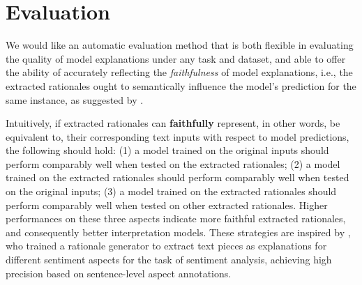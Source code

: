\documentclass[11pt,a4paper]{article}
\begin{document}
\section{Evaluation}
\label{sec:evaluation}
\begin{comment}
Though  substantial efforts have been invested to neural model interpretations, 
there has not been a generally accepted 
framework for evaluating different  interpretation models. 
One direct way for evaluation is to ask humans to annotate rationales within the input text, and compare  rationales extracted by interpretation models with human annotations, as in \newcite{deyoung-etal-2020-eraser}. 
The biggest issue with this methodology is that in many NLP tasks (e.g., fine-grained sentiment analysis), the difference between different labels is subtle (e.g.,  positive label v.s. very positive label or negative v.s. very negative label). It is thus hard for humans to annotate rationales that are both {\bf sufficient} and {\bf comprehensive}. 
Therefore, tasks in \newcite{deyoung-etal-2020-eraser}  are mostly limited to relatively easy NLP tasks, e.g., binary sentiment classification where 
for most data point, 
identifying constituent sentiment keywords suffices for predictions. 
\end{comment}
We would like an automatic evaluation method that is both flexible in evaluating the quality of model explanations under any task and dataset, and able to offer the ability of accurately reflecting the {\it faithfulness} of model explanations, i.e., the extracted rationales ought to semantically influence the model's prediction for the same instance,  as suggested by \citet{deyoung-etal-2020-eraser}.

Intuitively,  if  extracted rationales can {\bf faithfully} represent, in other words, be equivalent to, 
 their corresponding text inputs with respect to model predictions, the following should hold: 
(1)  a model trained on the original inputs 
   should perform comparably well when tested on the extracted rationales; 
   (2)  a model trained on the extracted rationales should  perform comparably well when tested on the original inputs;
   (3) a model trained on the  extracted rationales should  perform comparably well when tested on other extracted rationales.  
Higher performances on these three aspects indicate more faithful extracted rationales, and consequently better interpretation models. 
These strategies are inspired by , who trained a rationale generator to extract text pieces as explanations for different sentiment aspects for the task of sentiment analysis, achieving high precision based on  sentence-level aspect annotations. 
   
\end{document}
